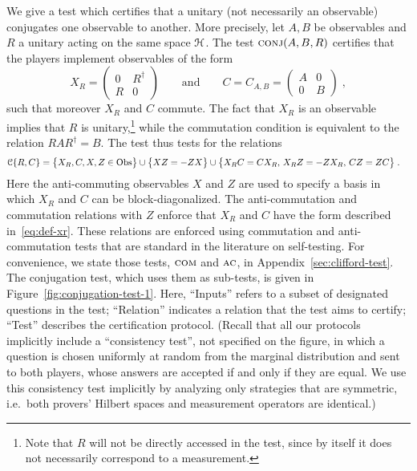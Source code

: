 We give a test which certifies that a unitary (not necessarily an observable) conjugates one observable to another. More precisely, let $A,B$ be observables and $R$ a unitary acting on the same space $\mathcal{H}$. The test $\textsc{conj}(A,B,R)$ certifies that the players implement observables of the form
\begin{equation}\label{eq:def-xr}
X_R = \begin{pmatrix} 0 & R^\dagger\\ R & 0 \end{pmatrix}\qquad \text{and}\qquad C = C_{A,B} = \begin{pmatrix} A & 0\\ 0 & B \end{pmatrix}\;,
\end{equation}
such that moreover $X_R$ and $C$ commute. The fact that $X_R$ is an observable implies that $R$ is unitary,\footnote{Note that $R$ will not be directly accessed in the test, since by itself it does not necessarily correspond to a measurement.} while the commutation condition is equivalent to the relation $RAR^\dagger = B$. The test thus tests for the relations
\begin{align*}
 \mathcal{C}\{R,C\} &= \big\{ X_R,C,X,Z\in \mathrm{Obs}\big\} \cup \big\{XZ=-ZX\big\}
\cup \big\{ X_R C = C X_R,\, X_RZ=-Z X_R,\, C Z=ZC\big\}\;.
\end{align*}
Here the anti-commuting observables $X$ and $Z$ are used to specify a basis in which $X_R$ and $C$ can be block-diagonalized. The anti-commutation and commutation relations with $Z$ enforce that $X_R$ and $C$ have the form described in~\eqref{eq:def-xr}.
These relations are enforced using commutation and anti-commutation tests that are standard in the literature on self-testing. For convenience, we state those tests, $\textsc{com}$ and $\textsc{ac}$, in Appendix~\ref{sec:clifford-test}. The conjugation test, which uses them as sub-tests, is given in Figure~\ref{fig:conjugation-test-1}. Here, ``Inputs'' refers to a subset of designated questions in the test; ``Relation'' indicates a relation that the test aims to certify; ``Test'' describes the certification protocol. (Recall that all our protocols implicitly include a ``consistency test'', not specified on the figure, in which a question is chosen uniformly at random from the marginal distribution and sent to both players, whose answers are accepted if and only if they are equal. We use this consistency test implicitly by analyzing only strategies that are symmetric, i.e.\ both provers' Hilbert spaces and measurement operators are identical.)

